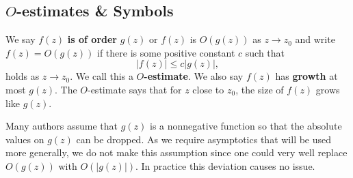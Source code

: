       \subsection*{\texorpdfstring{$O$}{O}-estimates \& Symbols}
        We say $f(z)$ \textbf{is of order} $g(z)$ or $f(z)$ is $O(g(z))$ as $z \to z_{0}$ and write $f(z) = O(g(z))$
        if there is some positive constant $c$ such that
        \[
          |f(z)| \le c|g(z)|,
        \]
        holds as $z \to z_{0}$. We call this a \textbf{$O$-estimate}. We also say $f(z)$ has \textbf{growth} at most $g(z)$. The $O$-estimate says that for $z$ close to $z_{0}$, the size of $f(z)$ grows like $g(z)$.
        
        \begin{remark}
          Many authors assume that $g(z)$ is a nonnegative function so that the absolute values on $g(z)$ can be dropped. As we require asymptotics that will be used more generally, we do not make this assumption since one could very well replace $O(g(z))$ with $O(|g(z)|)$. In practice this deviation causes no issue.
        \end{remark}
        
